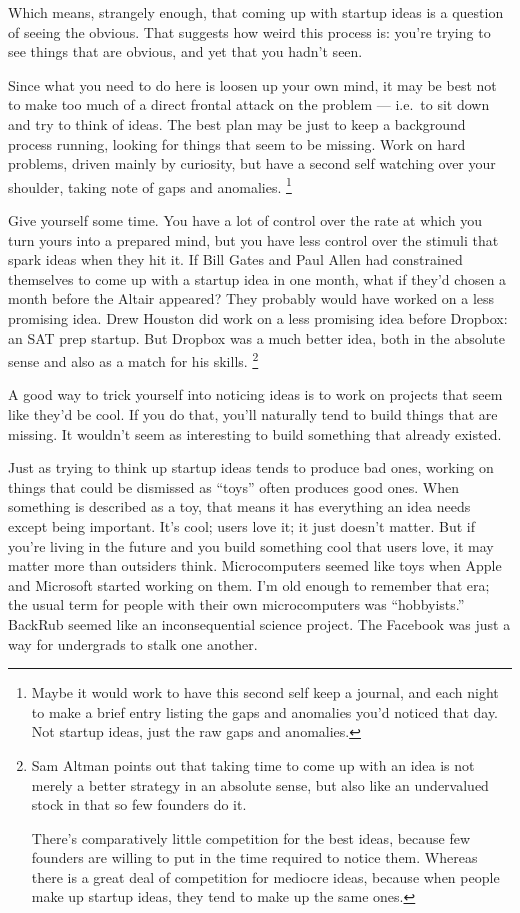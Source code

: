 \documentclass[12pt]{book}
\begin{document}
Which means, strangely enough, that coming up with startup ideas is a
question of seeing the obvious. That suggests how weird this process is:
you're trying to see things that are obvious, and yet that you hadn't
seen.

Since what you need to do here is loosen up your own mind, it may be
best not to make too much of a direct frontal attack on the problem ---
i.e.~to sit down and try to think of ideas. The best plan may be just to
keep a background process running, looking for things that seem to be
missing. Work on hard problems, driven mainly by curiosity, but have a
second self watching over your shoulder, taking note of gaps and
anomalies. \footnote{Maybe it would work to have this second self keep a journal, and
each night to make a brief entry listing the gaps and anomalies you'd
noticed that day. Not startup ideas, just the raw gaps and anomalies.}

Give yourself some time. You have a lot of control over the rate at
which you turn yours into a prepared mind, but you have less control
over the stimuli that spark ideas when they hit it. If Bill Gates and
Paul Allen had constrained themselves to come up with a startup idea in
one month, what if they'd chosen a month before the Altair appeared?
They probably would have worked on a less promising idea. Drew Houston
did work on a less promising idea before Dropbox: an SAT prep startup.
But Dropbox was a much better idea, both in the absolute sense and also
as a match for his skills. \footnote{Sam Altman points out that taking time to come up with an idea
is not merely a better strategy in an absolute sense, but also like an
undervalued stock in that so few founders do it.

There's comparatively little competition for the best ideas, because few
founders are willing to put in the time required to notice them. Whereas
there is a great deal of competition for mediocre ideas, because when
people make up startup ideas, they tend to make up the same ones.}

A good way to trick yourself into noticing ideas is to work on projects
that seem like they'd be cool. If you do that, you'll naturally tend to
build things that are missing. It wouldn't seem as interesting to build
something that already existed.

Just as trying to think up startup ideas tends to produce bad ones,
working on things that could be dismissed as ``toys'' often produces
good ones. When something is described as a toy, that means it has
everything an idea needs except being important. It's cool; users love
it; it just doesn't matter. But if you're living in the future and you
build something cool that users love, it may matter more than outsiders
think. Microcomputers seemed like toys when Apple and Microsoft started
working on them. I'm old enough to remember that era; the usual term for
people with their own microcomputers was ``hobbyists.'' BackRub seemed
like an inconsequential science project. The Facebook was just a way for
undergrads to stalk one another.
\end{document}
